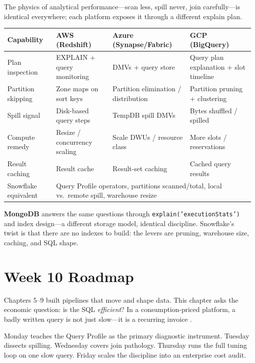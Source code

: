 \begin{crosscloud}
The physics of analytical performance---scan less, spill never, join carefully---is identical everywhere; each platform exposes it through a different explain plan.

\vspace{2mm}
{\footnotesize
\begin{tabular}{@{}p{2.8cm}p{3.0cm}p{3.0cm}p{3.0cm}@{}}
\toprule
\textbf{Capability} & \textbf{AWS (Redshift)} & \textbf{Azure (Synapse/Fabric)} & \textbf{GCP (BigQuery)} \\
\midrule
Plan inspection & EXPLAIN + query monitoring & DMVs + query store & Query plan explanation + slot timeline \\
Partition skipping & Zone maps on sort keys & Partition elimination / distribution & Partition pruning + clustering \\
Spill signal & Disk-based query steps & TempDB spill DMVs & Bytes shuffled / spilled \\
Compute remedy & Resize / concurrency scaling & Scale DWUs / resource class & More slots / reservations \\
Result caching & Result cache & Result-set caching & Cached query results \\
\addlinespace
Snowflake equivalent & \multicolumn{3}{l}{Query Profile operators, partitions scanned/total, local vs.\ remote spill, warehouse resize} \\
\bottomrule
\end{tabular}}

\vspace{1mm}
\textbf{MongoDB} answers the same questions through \texttt{explain('executionStats')} and index design---a different storage model, identical discipline. Snowflake's twist is that there are no indexes to build: the levers are pruning, warehouse size, caching, and SQL shape.
\end{crosscloud}

\section{Week 10 Roadmap}
Chapters 5--9 built pipelines that move and shape data. This chapter asks the economic question: is the SQL \emph{efficient}? In a consumption-priced platform, a badly written query is not just slow---it is a recurring invoice \cite{snowflakeQueryProfileDocs}.

Monday teaches the Query Profile as the primary diagnostic instrument. Tuesday dissects spilling. Wednesday covers join pathology. Thursday runs the full tuning loop on one slow query. Friday scales the discipline into an enterprise cost audit.

